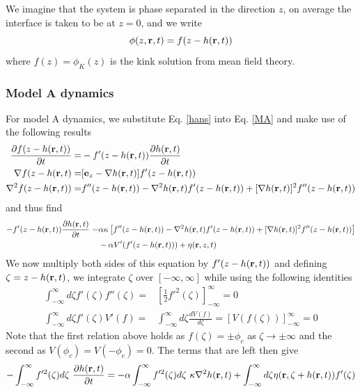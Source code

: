 We imagine that the system is phase separated in the direction  $z$, on average the interface is taken to be at $z=0$, and we write
\begin{equation}
    \phi(z,{\bf r},t) = f(z-h({\bf r},t))
    \label{hans}
\end{equation}
where $f(z)=\phi_K(z)$ is the kink solution from mean field theory.

    \subsubsection{Model A dynamics}

For model A dynamics, we substitute Eq. \eqref{hans} into Eq. \eqref{MA} and make use of the following results
\begin{align*}
    \frac{\partial f(z-h({\bf r},t))}{\partial t} =& -f'(z-h({\bf r},t))\frac{\partial h({\bf r},t)}{\partial t}\\
    \nabla f(z-h({\bf r},t) =& [{\bf e}_z-\nabla h({\bf r},t)]f'(z-h({\bf r},t))  \\
    \nabla^2 f(z-h({\bf r},t))=& f''(z-h({\bf r},t))- \nabla^2 h({\bf r},t)f'(z-h({\bf r},t))+ [\nabla h({\bf r},t)]^2 f''(z-h({\bf r},t))
\end{align*}
and thus find
\begin{align*}
 -f'(z-h({\bf r},t))\frac{\partial h({\bf r},t)}{\partial t}=& \alpha\kappa 
 \left[ f''(z-h({\bf r},t))- \nabla^2 h({\bf r},t)f'(z-h({\bf r},t))+ [\nabla h({\bf r},t)]^2 f''(z-h({\bf r},t))\right] \\
  & - \alpha V'(f'(z-h({\bf r},t))) + \eta({\bf r},z,t)
\end{align*}
We now multiply both sides of this equation by $f'(z-h({\bf r},t))$ and defining $\zeta=z-h({\bf r},t)$, we integrate  $\zeta$ over $[-\infty,\infty]$ while using the following identities
\begin{align*}
    \int_{-\infty}^\infty d\zeta f'(\zeta)f''(\zeta) =& [\frac{1}{2}f'^2(\zeta)]_{-\infty}^\infty =0 \\
    \int_{-\infty}^\infty d\zeta f'(\zeta) V'(f) =& \int_{-\infty}^\infty d\zeta\frac{d V(f)}{d\zeta}   =[V(f(\zeta))]_{-\infty}^\infty=0
\end{align*} 
Note that the first relation above holds as $f(\zeta)=\pm \phi_c$ as $\zeta\to\pm \infty$ and the second as
$V(\phi_c)=V(-\phi_c)=0$.
The terms that are left then give
\begin{equation}
    -\int_{-\infty}^\infty f'^2(\zeta)d\zeta\ \frac{\partial h(\br,t)}{\partial t}
    = -\alpha\int_{-\infty}^\infty f'^2(\zeta)d\zeta \ \kappa \nabla^2 h(\br,t) + \int_{-\infty}^\infty d\zeta \eta(\br,\zeta+ h(\br,t))f'(\zeta)
\end{equation}
